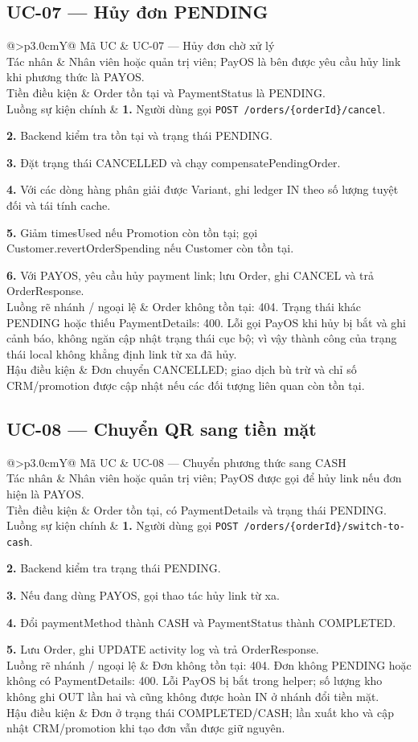 \documentclass[12pt,a4paper,oneside]{report}
\makeatletter
\newcommand{\UC}[6]{%
\par\medskip\noindent\begin{tabularx}{\textwidth}{@{}>{\bfseries\color{navy}}p{3.0cm}Y@{}}\toprule
Mã UC & #1\\
Tác nhân & #2\\
Tiền điều kiện & #3\\
Luồng sự kiện chính & #4\\
Luồng rẽ nhánh / ngoại lệ & #5\\
Hậu điều kiện & #6\\
\bottomrule\end{tabularx}\par\smallskip
}
\makeatother
\begin{document}
\subsection{UC-07 — Hủy đơn PENDING}
\UC{UC-07 — Hủy đơn chờ xử lý}{Nhân viên hoặc quản trị viên; PayOS là bên được yêu cầu hủy link khi phương thức là PAYOS.}{Order tồn tại và PaymentStatus là PENDING.}{\textbf{1.} Người dùng gọi \texttt{POST /orders/\{orderId\}/cancel}.\par\textbf{2.} Backend kiểm tra tồn tại và trạng thái PENDING.\par\textbf{3.} Đặt trạng thái CANCELLED và chạy compensatePendingOrder.\par\textbf{4.} Với các dòng hàng phân giải được Variant, ghi ledger IN theo số lượng tuyệt đối và tái tính cache.\par\textbf{5.} Giảm timesUsed nếu Promotion còn tồn tại; gọi Customer.revertOrderSpending nếu Customer còn tồn tại.\par\textbf{6.} Với PAYOS, yêu cầu hủy payment link; lưu Order, ghi CANCEL và trả OrderResponse.}{Order không tồn tại: 404. Trạng thái khác PENDING hoặc thiếu PaymentDetails: 400. Lỗi gọi PayOS khi hủy bị bắt và ghi cảnh báo, không ngăn cập nhật trạng thái cục bộ; vì vậy thành công của trạng thái local không khẳng định link từ xa đã hủy.}{Đơn chuyển CANCELLED; giao dịch bù trừ và chỉ số CRM/promotion được cập nhật nếu các đối tượng liên quan còn tồn tại.}

\subsection{UC-08 — Chuyển QR sang tiền mặt}
\UC{UC-08 — Chuyển phương thức sang CASH}{Nhân viên hoặc quản trị viên; PayOS được gọi để hủy link nếu đơn hiện là PAYOS.}{Order tồn tại, có PaymentDetails và trạng thái PENDING.}{\textbf{1.} Người dùng gọi \texttt{POST /orders/\{orderId\}/switch-to-cash}.\par\textbf{2.} Backend kiểm tra trạng thái PENDING.\par\textbf{3.} Nếu đang dùng PAYOS, gọi thao tác hủy link từ xa.\par\textbf{4.} Đổi paymentMethod thành CASH và PaymentStatus thành COMPLETED.\par\textbf{5.} Lưu Order, ghi UPDATE activity log và trả OrderResponse.}{Đơn không tồn tại: 404. Đơn không PENDING hoặc không có PaymentDetails: 400. Lỗi PayOS bị bắt trong helper; số lượng kho không ghi OUT lần hai và cũng không được hoàn IN ở nhánh đổi tiền mặt.}{Đơn ở trạng thái COMPLETED/CASH; lần xuất kho và cập nhật CRM/promotion khi tạo đơn vẫn được giữ nguyên.}
\end{document}
